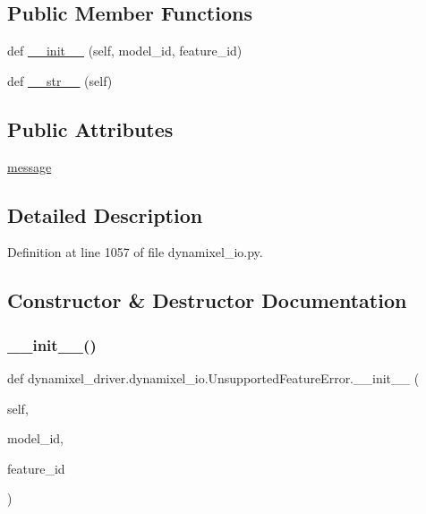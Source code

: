 \subsection*{Public Member Functions}
\begin{DoxyCompactItemize}
\item 
def \hyperlink{classdynamixel__driver_1_1dynamixel__io_1_1_unsupported_feature_error_ae0da9f23f2f857faac3092d1865bbe0f}{\+\_\+\+\_\+init\+\_\+\+\_\+} (self, model\+\_\+id, feature\+\_\+id)
\item 
def \hyperlink{classdynamixel__driver_1_1dynamixel__io_1_1_unsupported_feature_error_a0d0af7f9393fbf86133895905f43cf59}{\+\_\+\+\_\+str\+\_\+\+\_\+} (self)
\end{DoxyCompactItemize}
\subsection*{Public Attributes}
\begin{DoxyCompactItemize}
\item 
\hyperlink{classdynamixel__driver_1_1dynamixel__io_1_1_unsupported_feature_error_a2d5aa0c4ec2bc2509837759ca9b021bd}{message}
\end{DoxyCompactItemize}


\subsection{Detailed Description}


Definition at line 1057 of file dynamixel\+\_\+io.\+py.



\subsection{Constructor \& Destructor Documentation}
\mbox{\label{classdynamixel__driver_1_1dynamixel__io_1_1_unsupported_feature_error_ae0da9f23f2f857faac3092d1865bbe0f}} 
\subsubsection{\texorpdfstring{\+\_\+\+\_\+init\+\_\+\+\_\+()}{\_\_init\_\_()}}
{\footnotesize\ttfamily def dynamixel\+\_\+driver.\+dynamixel\+\_\+io.\+Unsupported\+Feature\+Error.\+\_\+\+\_\+init\+\_\+\+\_\+ (\begin{DoxyParamCaption}\item[{}]{self,  }\item[{}]{model\+\_\+id,  }\item[{}]{feature\+\_\+id }\end{DoxyParamCaption})}



